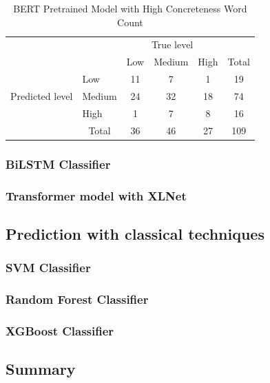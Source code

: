 \documentclass[12pt, a4paper]{article}
\begin{document}
\begin{table}[ht]
\centering
\begin{tabular}{l|l|c|c|c|c}
\multicolumn{2}{c}{}&\multicolumn{3}{c}{True level}&\\
\cline{3-5}
\multicolumn{2}{c|}{}&Low&Medium&High&\multicolumn{1}{c}{Total}\\
\cline{2-5}
\multirow{3}{*}{Predicted level}& Low & 11 & 7 & 1 & 19\\
\cline{2-5}
& Medium & 24 & 32 & 18 & 74\\
\cline{2-5}
& High & 1 & 7 & 8 & 16\\
\cline{2-5}
\multicolumn{1}{c}{} & \multicolumn{1}{c}{Total} & \multicolumn{1}{c}{36} & \multicolumn{    1}{c}{46} & \multicolumn{    1}{c}{27} & \multicolumn{1}{c}{109}\\
\end{tabular}
\caption{BERT Pretrained Model with High Concreteness Word Count}
\label{table:pretrained2}
\end{table}

\subsubsection{BiLSTM Classifier}

\subsubsection{Transformer model with XLNet}

\subsection{Prediction with classical techniques}

\subsubsection{SVM Classifier}

\subsubsection{Random Forest Classifier}

\subsubsection{XGBoost Classifier}

\subsection{Summary}



\end{document}
